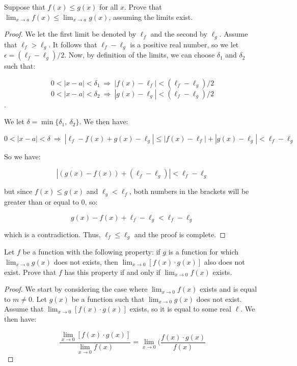 \documentclass[10pt, oneside]{article}
\newenvironment{problem}[2][Problem]{\begin{trivlist}
\item[\hskip \labelsep {\bfseries #1}\hskip \labelsep {\bfseries #2.}]}{\end{trivlist}}
\begin{document}
    \begin{problem}{5.12}

      Suppose that $f(x) \leq g(x)$ for all $x$. Prove that $\lim_{x \to a} f(x) \leq \lim_{x \to a} g(x)$, assuming the limits exist.

    \end{problem}

    \begin{proof}

      We let the first limit be denoted by $\ell_f$ and the second by $\ell_g$. Assume that $\ell_f > \ell_g$. It follows that
      $\ell_f - \ell_g$ is a positive real number, so we let $\epsilon = (\ell_f - \ell_g)/2$. Now, by definition of the limits, we
      can choose $\delta_1$ and $\delta_2$ such that:

      $$0 < |x - a| < \delta_1 \ \Rightarrow \ |f(x) - \ell_f| < (\ell_f - \ell_g)/2$$
      $$0 < |x - a| < \delta_2 \ \Rightarrow \ |g(x) - \ell_g| < (\ell_f - \ell_g)/2$$.

      We let $\delta = \min\{\delta_1, \ \delta_2\}$. We then have:

      $$0 < |x - a| < \delta \ \Rightarrow \ |\ell_f - f(x) + g(x) - \ell_g| \leq |f(x) - \ell_f| + |g(x) - \ell_g| < \ell_f - \ell_g$$

      So we have:

      $$|(g(x) - f(x)) + (\ell_f - \ell_g)| < \ell_f - \ell_g$$

      but since $f(x) \leq g(x)$ and $\ell_g < \ell_f$, both numbers in the brackets will be greater than or equal to $0$, so:

      $$g(x) - f(x) + \ell_f - \ell_g < \ell_f - \ell_g$$

      which is a contradiction. Thus, $\ell_f \leq \ell_g$ and the proof is complete.

      \end{proof}

    \begin{problem}{5.23}

      Let $f$ be a function with the following property: if $g$ is a function for which $\lim_{x \to 0} g(x)$ does not exists, then $\lim_{x \to 0} [f(x) \cdot g(x)]$ also does not exist. Prove
      that $f$ has this property if and only if $\lim_{x \to 0} f(x)$ exists.

    \end{problem}

    \begin{proof}

      We start by considering the case where $\lim_{x \to 0} f(x)$ exists and is equal to $m \neq 0$. Let $g(x)$ be a function such that $\lim_{x \to 0} g(x)$ does not exist. Assume that $\lim_{x \to 0} [f(x) \cdot g(x)]$
      exists, so it is equal to some real $\ell$. We then have:

     $$\frac{\lim_{x \to 0} [f(x) \cdot g(x)]}{\lim_{x \to 0} f(x)} = \lim_{x \to 0} \Big(\frac{f(x) \cdot g(x)}{f(x)}$$

    \end{proof}
\end{document}

